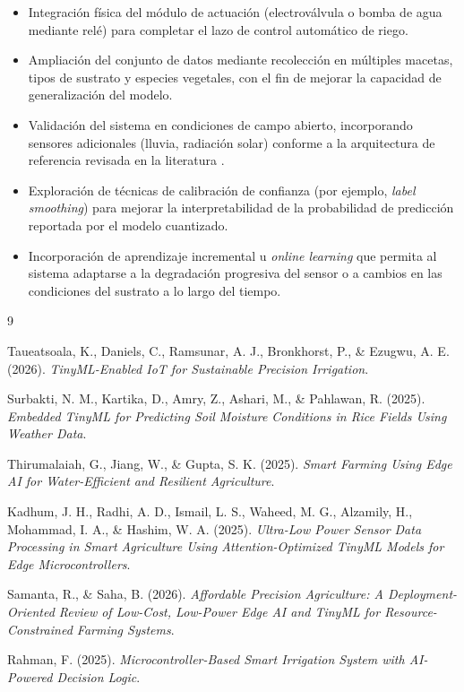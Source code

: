 \documentclass[12pt,a4paper]{article}
\begin{document}
\begin{itemize}
    \item Integración física del módulo de actuación (electroválvula o bomba de agua mediante relé) para completar el lazo de control automático de riego.
    \item Ampliación del conjunto de datos mediante recolección en múltiples macetas, tipos de sustrato y especies vegetales, con el fin de mejorar la capacidad de generalización del modelo.
    \item Validación del sistema en condiciones de campo abierto, incorporando sensores adicionales (lluvia, radiación solar) conforme a la arquitectura de referencia revisada en la literatura \cite{thirumalaiah2025}.
    \item Exploración de técnicas de calibración de confianza (por ejemplo, \textit{label smoothing}) para mejorar la interpretabilidad de la probabilidad de predicción reportada por el modelo cuantizado.
    \item Incorporación de aprendizaje incremental u \textit{online learning} que permita al sistema adaptarse a la degradación progresiva del sensor o a cambios en las condiciones del sustrato a lo largo del tiempo.
\end{itemize}

\newpage
\begin{thebibliography}{9}

Taueatsoala, K., Daniels, C., Ramsunar, A. J., Bronkhorst, P., \& Ezugwu, A. E. (2026).
\textit{TinyML-Enabled IoT for Sustainable Precision Irrigation}.

Surbakti, N. M., Kartika, D., Amry, Z., Ashari, M., \& Pahlawan, R. (2025).
\textit{Embedded TinyML for Predicting Soil Moisture Conditions in Rice Fields Using Weather Data}.

Thirumalaiah, G., Jiang, W., \& Gupta, S. K. (2025).
\textit{Smart Farming Using Edge AI for Water-Efficient and Resilient Agriculture}.

Kadhum, J. H., Radhi, A. D., Ismail, L. S., Waheed, M. G., Alzamily, H., Mohammad, I. A., \& Hashim, W. A. (2025).
\textit{Ultra-Low Power Sensor Data Processing in Smart Agriculture Using Attention-Optimized TinyML Models for Edge Microcontrollers}.

Samanta, R., \& Saha, B. (2026).
\textit{Affordable Precision Agriculture: A Deployment-Oriented Review of Low-Cost, Low-Power Edge AI and TinyML for Resource-Constrained Farming Systems}.

Rahman, F. (2025).
\textit{Microcontroller-Based Smart Irrigation System with AI-Powered Decision Logic}.

\end{thebibliography}
\end{document}
